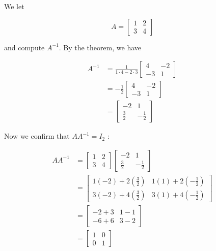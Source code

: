 \begin{example} We let

\[
A=\left[\begin{array}{ll}
1 & 2 \\
3 & 4
\end{array}\right]
\]

and compute $A^{-1}$. By the theorem, we have

\[
\begin{aligned}
A^{-1} & =\frac{1}{1 \cdot 4-2 \cdot 3}\left[\begin{array}{cc}
4 & -2 \\
-3 & 1
\end{array}\right] \\
& =-\frac{1}{2}\left[\begin{array}{cc}
4 & -2 \\
-3 & 1
\end{array}\right] \\
& =\left[\begin{array}{cc}
-2 & 1 \\
\frac{3}{2} & -\frac{1}{2}
\end{array}\right]
\end{aligned}
\]

Now we confirm that $A A^{-1}=I_2$ :

\[
\begin{aligned}
A A^{-1} & =\left[\begin{array}{ll}
1 & 2 \\
3 & 4
\end{array}\right]\left[\begin{array}{cc}
-2 & 1 \\
\frac{3}{2} & -\frac{1}{2}
\end{array}\right] \\
& =\left[\begin{array}{ll}
1(-2)+2\left(\frac{3}{2}\right) & 1(1)+2\left(-\frac{1}{2}\right) \\
3(-2)+4\left(\frac{3}{2}\right) & 3(1)+4\left(-\frac{1}{2}\right)
\end{array}\right] \\
& =\left[\begin{array}{ll}
-2+3 & 1-1 \\
-6+6 & 3-2
\end{array}\right] \\
& =\left[\begin{array}{ll}
1 & 0 \\
0 & 1
\end{array}\right]
\end{aligned}
\]
\label{ex:inverse}
\end{example}

